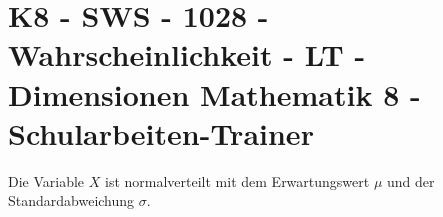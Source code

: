 \section{K8 - SWS - 1028 - Wahrscheinlichkeit - LT - Dimensionen Mathematik 8 - Schularbeiten-Trainer}

\begin{beispiel}[K8 - SWS]{1}
Die Variable $X$ ist normalverteilt mit dem Erwartungswert $\mu$ und der Standardabweichung $\sigma$.

\end{beispiel}
